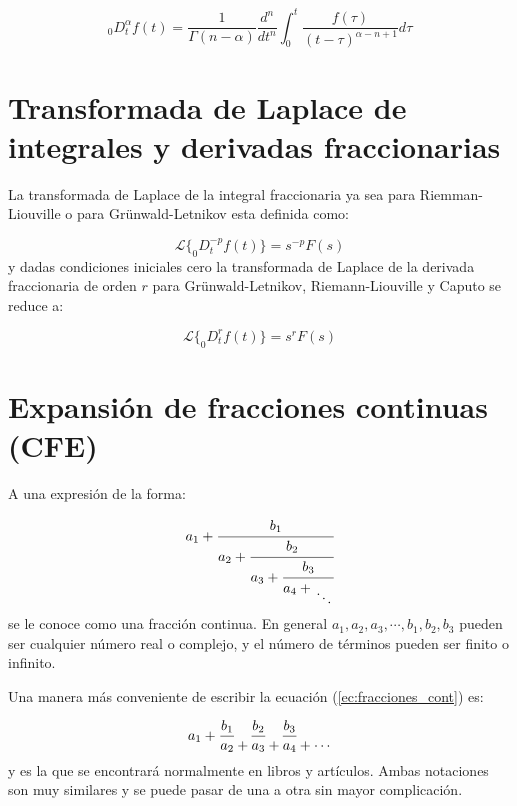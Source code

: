 	\begin{equation}
		_{0}D_{t}^{\alpha}f(t) = \frac{1}{\Gamma(n-\alpha)} \frac{d^{n}}{dt^{n}} \int_{0}^{t} \frac{f(\tau)}{(t - \tau)^{\alpha - n + 1}} d\tau
	\end{equation}
		
	\section{Transformada de Laplace de integrales y derivadas fraccionarias}
	
	La transformada de Laplace de la integral fraccionaria ya sea para Riemman-Liouville o para Grünwald-Letnikov esta definida como:
	
	\begin{equation}
	 	\mathcal{L} \{ _{0}D_{t}^{-p} f(t) \} = s^{-p} F(s)
	\end{equation} 
	y dadas condiciones iniciales cero  la transformada de Laplace de la derivada fraccionaria de orden $r$ para Grünwald-Letnikov, Riemann-Liouville y Caputo se reduce a:
	
	\begin{equation}
		\mathcal{L} \{ _{0}D_{t}^{r} f(t) \} = s^{r} F(s)
	\end{equation}
	
	
	\section{Expansión de fracciones continuas (CFE)}\label{sec:CFE}
	
	A una expresión de la forma:

	\begin{equation}
		a_{1} + \cfrac{b_{1}}{a_{2} + \cfrac{b_{2}}{a_{3} + \cfrac{b_{3}}{a_{4} + \genfrac{}{}{0pt}{0}{}{\ddots}}}}
		\label{ec:fracciones_cont}
	\end{equation} 
	se le conoce como una fracción continua. En general $a_{1},a_{2},a_{3}, \cdots, b_{1}, b_{2}, b_{3}$ pueden ser cualquier número real o complejo, y el número de términos pueden ser finito o infinito.

	Una manera más conveniente de escribir la ecuación (\ref{ec:fracciones_cont}) es:

	\begin{equation}
		a_{1} + \frac{b_{1}}{a_{2} } \genfrac{}{}{0pt}{0}{}{+}   \frac{b_{2}}{a_{3}}  \genfrac{}{}{0pt}{0}{}{+}  \frac{b_{3}}{a_{4}}  \genfrac{}{}{0pt}{0}{}{+}  \genfrac{}{}{0pt}{0}{}{\cdots} 
		\label{ec:fracciones_cont_sim}
	\end{equation}
	y es la que se encontrará normalmente en libros y artículos. Ambas notaciones son  muy similares y se puede pasar de una a otra sin mayor complicación.

